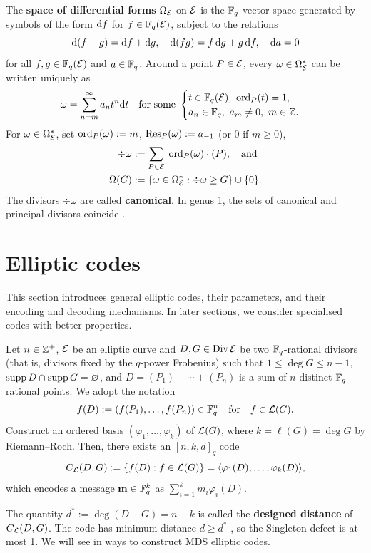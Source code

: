 \documentclass[twocolumn, 11pt]{scrartcl}
\begin{document}
The \textbf{space of differential forms} $\Omega_\mcE$ on $\mcE$ is the $\bbF_q$-vector space generated by symbols of the form $\df$ for $f\in\bbF_q(\mcE)$, subject to the relations
\[ \dx[(f+g)]=\df+\dg,\quad \dx[(fg)]=f\,\dg+g\,\df,\quad \da=0 \]
for all $f,g\in\bbF_q(\mcE)$ and $a\in\bbF_q$. Around a point $P\in\mcE$, every $\omega\in\Omega_\mcE^*$ can be written uniquely as
\[ \omega=\sum_{n=m}^\infty a_nt^n\dt\quad\text{for some  } \begin{cases}
        t\in\bbF_q(\mcE),\ \ord_P(t)=1, \\
        a_n\in\bbF_q,\ a_m\neq 0,\ m\in\bbZ.
    \end{cases} \]
For $\omega\in\Omega_\mcE^*$, set $\ord_P(\omega):=m$, $\Res_P(\omega):=a_{-1}$ (or 0 if $m\geq 0$),
\vspace{-9pt}
\begin{align*}
    \div\omega&:=\sum_{P\in\mcE}\;\ord_P(\omega)\cdot(P),\quad\text{and}\\
    \Omega(G)&:=\set{\omega\in\Omega_\mcE^*:\div\omega\geq G}\cup\set0.
\end{align*}
The divisors $\div\omega$ are called \textbf{canonical}. In genus 1, the sets of canonical and principal divisors coincide \cite[Cor.~1.4.12]{stichtenoth2009algebraic}.

\section{Elliptic codes} \label{section:ecc}

This section introduces general elliptic codes, their parameters, and their encoding and decoding mechanisms. In later sections, we consider specialised codes with better properties.

Let $n\in\bbZ^+$, $\mcE$ be an elliptic curve and $D,G\in\Div\mcE$ be two $\bbF_q$-rational divisors (that is, divisors fixed by the $q$-power Frobenius) such that $1\leq\deg G\leq n-1$, $\supp D\cap\supp G=\emptyset$, and $D=(P_1)+\cdots+(P_n)$ is a sum of $n$ distinct $\bbF_q$-rational points. We adopt the notation
\[ f(D):=(f(P_1),\hdots,f(P_n))\in\bbF_q^n\qtx{for}f\in\mcL(G). \]
Construct an ordered basis $(\varphi_1,\hdots,\varphi_k)$ of $\mcL(G)$, where $k=\ell(G)=\deg G$ by Riemann--Roch. Then, there exists an $[n,k,d]_q$ code
\[ C_\mcL(D,G):=\set{f(D):f\in\mcL(G)}=\ang{\varphi_1(D),\hdots,\varphi_k(D)}, \]
which encodes a message $\bfm\in\bbF_q^k$ as $\sum_{i=1}^k m_i\varphi_i(D)$.

The quantity $d^*:=\deg(D-G)=n-k$ is called the \textbf{designed distance} of $C_\mcL(D,G)$. The code has minimum distance $d\geq d^*$ \cite[\S2]{stichtenoth2009algebraic}, so the Singleton defect is at most 1. We will see in  ways to construct MDS elliptic codes.
\end{document}
